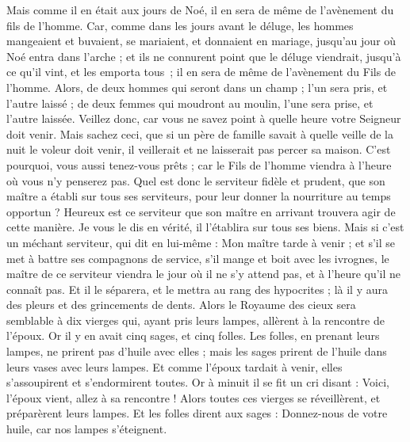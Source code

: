 \begin{multicols}{2}
Mais comme il en était aux jours de Noé, il en sera de même de l’avènement du fils de l’homme.
Car, comme dans les jours avant le déluge, les hommes mangeaient et buvaient, se mariaient, et donnaient en mariage, jusqu'au jour où Noé entra dans l'arche ;
et ils ne connurent point que le déluge viendrait, jusqu’à ce qu’il vint, et les emporta tous ; il en sera de même de l’avènement du Fils de l’homme.
Alors, de deux hommes qui seront dans un champ ; l'un sera pris, et l'autre laissé ;
de deux femmes qui moudront au moulin, l'une sera prise, et l'autre laissée.
Veillez donc, car vous ne savez point à quelle heure votre Seigneur doit venir.
Mais sachez ceci, que si un père de famille savait à quelle veille de la nuit le voleur doit venir, il veillerait et ne laisserait pas percer sa maison.
C'est pourquoi, vous aussi tenez-vous prêts ; car le Fils de l'homme viendra à l'heure où vous n'y penserez pas.
Quel est donc le serviteur fidèle et prudent, que son maître a établi sur tous ses serviteurs, pour leur donner la nourriture au temps opportun ?
Heureux est ce serviteur que son maître en arrivant trouvera agir de cette manière.
Je vous le dis en vérité, il l'établira sur tous ses biens.
Mais si c'est un méchant serviteur, qui dit en lui-même : Mon maître tarde à venir ;
et s’il se met à battre ses compagnons de service, s’il mange et boit avec les ivrognes,
le maître de ce serviteur viendra le jour où il ne s’y attend pas, et à l'heure qu'il ne connaît pas.
Et il le séparera, et le mettra au rang des hypocrites ; là il y aura des pleurs et des grincements de dents.
\VerseOne{}Alors le Royaume des cieux sera semblable à dix vierges qui, ayant pris leurs lampes, allèrent à la rencontre de l'époux.
Or il y en avait cinq sages, et cinq folles.
Les folles, en prenant leurs lampes, ne prirent pas d'huile avec elles ;
mais les sages prirent de l'huile dans leurs vases avec leurs lampes.
Et comme l'époux tardait à venir, elles s’assoupirent et s'endormirent toutes.
Or à minuit il se fit un cri disant : Voici, l'époux vient, allez à sa rencontre !
Alors toutes ces vierges se réveillèrent, et préparèrent leurs lampes.
Et les folles dirent aux sages : Donnez-nous de votre huile, car nos lampes s'éteignent.

\end{multicols}
